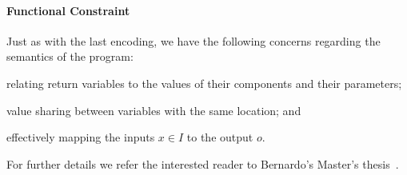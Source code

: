 \paragraph{Functional Constraint}

Just as with the last encoding, we have the following concerns regarding the
semantics of the program:
\begin{enumerate*}[(1)]
\item \label{itm:whole-fc-one} relating return variables to the values of their
components and their parameters;
\item \label{itm:whole-fc-two} value sharing between variables with the same
location; and
\item \label{itm:whole-fc-three} effectively mapping the inputs $x \in I$ to the
output $o$.
\end{enumerate*}

For further details we refer the interested reader to Bernardo's Master's
thesis~\cite{Bernardo:2019:PSO}.